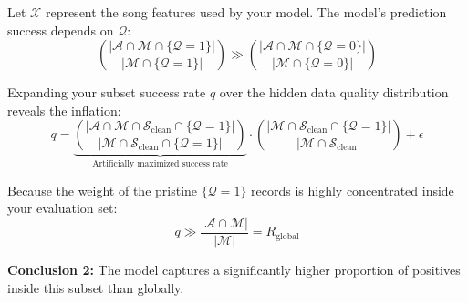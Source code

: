 Let $\mathcal{X}$ represent the song features used by your model. The model's prediction success depends on $\mathcal{Q}$:
\begin{equation}
\left( \frac{|\mathcal{A} \cap \mathcal{M} \cap \{\mathcal{Q}=1\}|}{|\mathcal{M} \cap \{\mathcal{Q}=1\}|} \right) \gg \left( \frac{|\mathcal{A} \cap \mathcal{M} \cap \{\mathcal{Q}=0\}|}{|\mathcal{M} \cap \{\mathcal{Q}=0\}|} \right)
\end{equation}

Expanding your subset success rate $q$ over the hidden data quality distribution reveals the inflation:
\begin{equation}
q = \underbrace{\left( \frac{|\mathcal{A} \cap \mathcal{M} \cap \mathcal{S}_{\text{clean}} \cap \{\mathcal{Q}=1\}|}{|\mathcal{M} \cap \mathcal{S}_{\text{clean}} \cap \{\mathcal{Q}=1\}|} \right)}_{\text{Artificially maximized success rate}} \cdot \left( \frac{|\mathcal{M} \cap \mathcal{S}_{\text{clean}} \cap \{\mathcal{Q}=1\}|}{|\mathcal{M} \cap \mathcal{S}_{\text{clean}}|} \right) + \epsilon
\end{equation}

Because the weight of the pristine $\{\mathcal{Q}=1\}$ records is highly concentrated inside your evaluation set:
\begin{equation}
q \gg \frac{|\mathcal{A} \cap \mathcal{M}|}{|\mathcal{M}|} = R_{\text{global}}
\end{equation}

\textbf{Conclusion 2:} The model captures a significantly higher proportion of positives inside this subset than globally.
